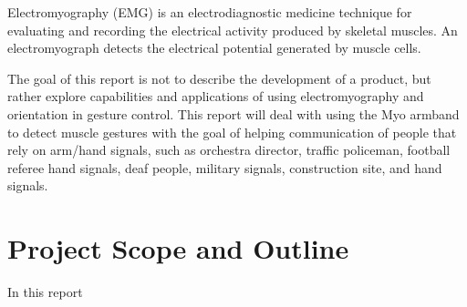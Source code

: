 \begin{sloppypar}
Electromyography (EMG) is an electrodiagnostic medicine technique for evaluating and recording the electrical activity produced by skeletal muscles. An electromyograph detects the electrical potential generated by muscle cells.
\end{sloppypar}

The goal of this report is not to describe the development of a product, but rather explore capabilities and applications of using electromyography and orientation in gesture control. This report will deal with using the Myo armband to detect muscle gestures with the goal of helping communication of people that rely on arm/hand signals, such as orchestra director, traffic policeman, football referee hand signals, deaf people, military signals, construction site, and hand signals.

\section{Project Scope and Outline}
\label{sec:project_scop_and_outline}
In this report 